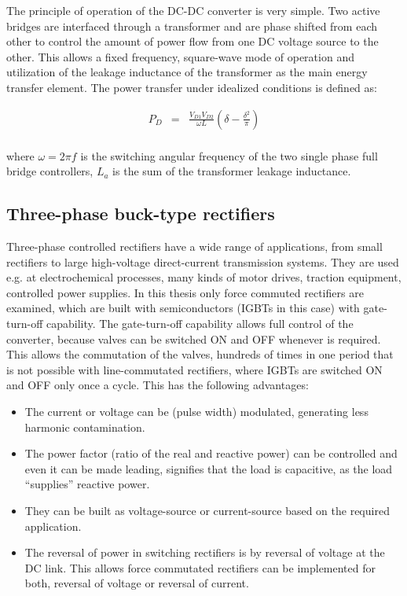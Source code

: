 The principle of operation of the DC-DC converter is very simple. Two active bridges are interfaced through a transformer and are phase shifted from each other to control the amount of power flow from one DC voltage source to the other. This allows a fixed frequency, square-wave mode of operation and utilization of the leakage inductance of the transformer as the main energy transfer element. The power transfer under idealized conditions is defined as:

\begin{equation}
        \begin{array}{rcl}
            P_D&=&\frac{V_{D1}V_{D2}}{\omega L}\left(\delta-\frac{\delta^2}{\pi}\right)\\
        \end{array}
        \label{BASICMPC:equ:DCDC}
    \end{equation}
		
		where $\omega=2\pi f$ is the switching angular frequency of the two single phase full bridge controllers, $L_a$ is the
sum of the transformer leakage inductance.

\subsection{Three-phase buck-type rectifiers}\label{BASICCSR:sec:CSR}

Three-phase controlled rectifiers have a wide range of applications, from small rectifiers to large high-voltage direct-current transmission systems. They are used e.g. at electrochemical processes, many kinds of motor drives, traction equipment, controlled power supplies. In this thesis only force commuted rectifiers are examined, which are built with semiconductors (IGBTs in this case) with gate-turn-off capability. The gate-turn-off capability allows full control of the converter, because valves can be switched ON and OFF whenever is required. This allows the commutation of the valves, hundreds of times in one period that is not possible with line-commutated rectifiers, where IGBTs are switched ON and OFF only once a cycle. This has the following advantages:

\begin{itemize}
\item The current or voltage can be (pulse width) modulated, generating less harmonic contamination.
\item The power factor (ratio of the real and reactive power) can be controlled and even it can be made leading, signifies that the load is capacitive, as the load “supplies” reactive power.
\item They can be built as voltage-source or current-source based on the required application.
\item The reversal of power in switching rectifiers is by reversal of voltage at the DC link. This allows force commutated rectifiers can be implemented for both, reversal of voltage or reversal of current.
\end{itemize}

